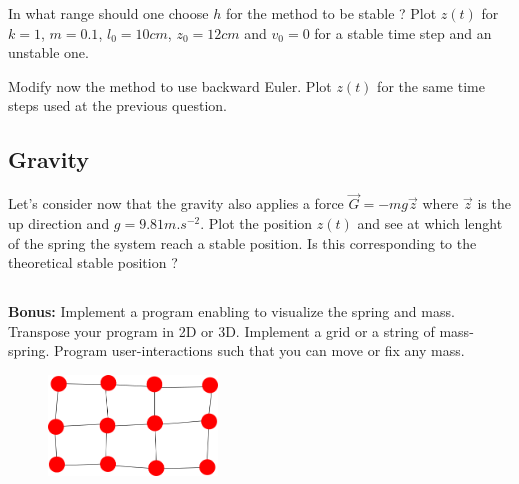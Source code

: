 In what range should one choose $h$ for the method to be stable ?
Plot $z(t)$ for $k = 1$, $m = 0.1$, $l_0 = 10cm$, $z_0 = 12cm$ and $v_0 = 0$ for a stable time step and an unstable one.

Modify now the method to use backward Euler. Plot $z(t)$ for the same time steps used at the previous question.

\subsection{Gravity} Let's consider now that the gravity also applies a force $\vec{G} = - m g \vec{z}$ where $\vec{z}$ is the up direction and $g = 9.81m.s^{-2}$. Plot the position $z(t)$ and see at which lenght of the spring the system reach a stable position. Is this corresponding to the theoretical stable position ?

\subsection{} \textbf{Bonus:} Implement a program enabling to visualize the spring and mass. Transpose your program in 2D or 3D. Implement a grid or a string of mass-spring. Program user-interactions such that you can move or fix any mass.

\begin{figure}[h]
  \centering
  \includegraphics[width=0.4\textwidth]{springs.png}
\end{figure}
